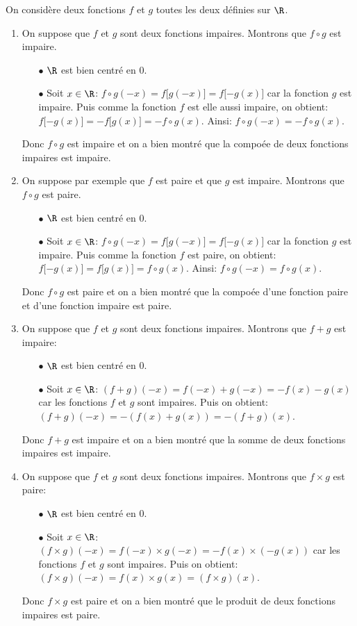 \begin{correction}  \;
On consid\`{e}re deux fonctions $f$ et $g$ toutes les deux d\'efinies sur $\R$.
\begin{enumerate}
\item On suppose que $f$ et $g$ sont deux fonctions impaires. Montrons que $f\circ g$ est impaire.
\begin{itemize}
\item[$\bullet$] $\R$ est bien centr\'e en 0.
\item[$\bullet$] Soit $x\in\R$: $f\circ g(-x)=f\lbrack g(-x)\rbrack=f\lbrack -g(x)\rbrack$ car la fonction $g$ est impaire. Puis comme la fonction $f$ est elle aussi impaire, on obtient: $f\lbrack -g(x)\rbrack=-f\lbrack g(x)\rbrack=-f\circ g(x)$. Ainsi: $f\circ g(-x)=-f\circ g(x)$.
\end{itemize} 
Donc $f\circ g$ est impaire et on a bien montr\'e que la compo\'ee de deux fonctions impaires est impaire.
\item On suppose par exemple que $f$ est paire et que $g$ est impaire. Montrons que $f\circ g$ est paire.
\begin{itemize}
\item[$\bullet$] $\R$ est bien centr\'e en 0.
\item[$\bullet$] Soit $x\in\R$: $f\circ g(-x)=f\lbrack g(-x)\rbrack=f\lbrack -g(x)\rbrack$ car la fonction $g$ est impaire. Puis comme la fonction $f$ est paire, on obtient: $f\lbrack -g(x)\rbrack=f\lbrack g(x)\rbrack=f\circ g(x)$. Ainsi: $f\circ g(-x)=f\circ g(x)$.
\end{itemize} 
Donc $f\circ g$ est paire et on a bien montr\'e que la compo\'ee d'une fonction paire et d'une fonction impaire est paire.
\item On suppose que $f$ et $g$ sont deux fonctions impaires. Montrons que $f+g$ est impaire:
\begin{itemize}
\item[$\bullet$] $\R$ est bien centr\'e en 0.
\item[$\bullet$] Soit $x\in\R$: $(f+ g)(-x)=f(-x)+ g(-x)=-f(x)-g(x)$ car les fonctions $f$ et $g$ sont impaires. Puis on obtient: 
$(f+g)(-x)=-(f(x)+g(x))=-(f+g)(x)$.
\end{itemize} 
Donc $f + g$ est impaire et on a bien montr\'e que la somme de deux fonctions impaires est impaire.
\item On suppose que $f$ et $g$ sont deux fonctions impaires. Montrons que $f\times g$ est paire:
\begin{itemize}
\item[$\bullet$] $\R$ est bien centr\'e en 0.
\item[$\bullet$] Soit $x\in\R$: $(f\times g)(-x)=f(-x)\times g(-x)=-f(x)\times (-g(x))$ car les fonctions $f$ et $g$ sont impaires. Puis on obtient: 
$(f\times g)(-x)=f(x)\times g(x)=(f\times g)(x)$.
\end{itemize} 
Donc $f \times g$ est paire et on a bien montr\'e que le produit de deux fonctions impaires est paire.
\end{enumerate}
\end{correction}
